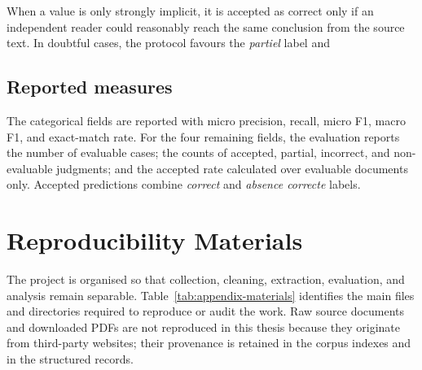 \documentclass[
11pt,
english,
singlespacing,
headsepline,
]{MastersDoctoralThesis}
\begin{document}
When a value is only strongly implicit, it is accepted as correct only if an
independent reader could reasonably reach the same conclusion from the source
text. In doubtful cases, the protocol favours the \textit{partiel} label and

\section{Reported measures}

The categorical fields are reported with micro precision, recall, micro F1,
macro F1, and exact-match rate. For the four remaining fields, the evaluation
reports the number of evaluable cases; the counts of accepted, partial,
incorrect, and non-evaluable judgments; and the accepted rate calculated over
evaluable documents only. Accepted predictions combine \textit{correct} and
\textit{absence correcte} labels.

\chapter{Reproducibility Materials}

The project is organised so that collection, cleaning, extraction, evaluation,
and analysis remain separable. Table~\ref{tab:appendix-materials} identifies
the main files and directories required to reproduce or audit the work. Raw
source documents and downloaded PDFs are not reproduced in this thesis because
they originate from third-party websites; their provenance is retained in the
corpus indexes and in the structured records.
\end{document}
